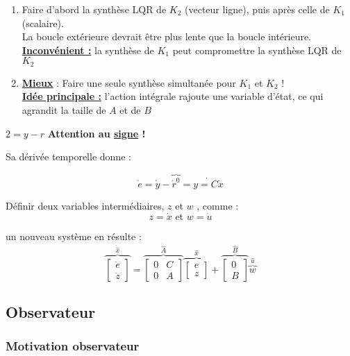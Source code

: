 \documentclass[document.tex]{subfiles}
\begin{document}
\begin{enumerate}
\item Faire d'abord la synthèse LQR de $K_2$ (vecteur ligne), puis après celle de $K_1$ (scalaire).\\
La boucle extérieure devrait être plus lente que la boucle intérieure.\\
\textbf{\underline{Inconvénient :}} la synthèse de $K_1$ peut compromettre la synthèse LQR de $K_2$
\item \textbf{\underline{Mieux}} : Faire une seule synthèse simultanée pour $K_1$ et $K_2$ !\\
\textbf{\underline{Idée principale :}} l'action intégrale rajoute une variable d'état, ce qui agrandit la taille de $A$ et de $B$
\end{enumerate}

\begin{center}
$2=y-r$ \textbf{Attention au \underline{signe} !}
\end{center}

Sa dérivée temporelle donne :

$$\dot{e}=\dot{y}-\overbrace{\dot{r}^0}=\dot{y=C\dot{x}}$$

Définir deux variables intermédiaires, $z$ et $w$ , comme :
$$ z=\dot{x} \text{ et } w = \dot{u}$$

un nouveau système en résulte :
$$ \overbrace{\begin{bmatrix} \dot{e} \\ \dot{z} \end{bmatrix}}^{\dot{\hat{x}}} = \overbrace{\begin{bmatrix} 0 & C \\ 0 & A \end{bmatrix}}^{\dot{\hat{A}}} \overbrace{\begin{bmatrix} e \\ z \end{bmatrix}}^{\hat{x}} + \overbrace{\begin{bmatrix} 0 \\ B \end{bmatrix}}^{\hat{B}} \overbrace{w}^{\hat{u}}$$


\subsection{Observateur}

\subsubsection{Motivation observateur}
\end{document}
